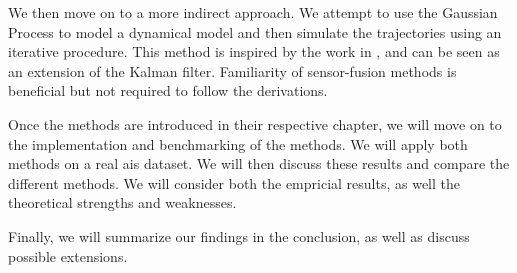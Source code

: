 We then move on to a more indirect approach. We attempt to use the Gaussian Process to model a dynamical model and then simulate the trajectories using an iterative procedure. This method is inspired by the work in \cite{pedestrian,gpekf}, and can be seen as an extension of the Kalman filter. Familiarity of sensor-fusion methods is beneficial but not required to follow the derivations.

Once the methods are introduced in their respective chapter, we will move on to the implementation and benchmarking of the methods. We will apply both methods on a real \acrshort{ais} dataset. We will then discuss these results and compare the different methods. We will consider both the empricial results, as well the theoretical strengths and weaknesses. 

Finally, we will summarize our findings in the conclusion, as well as discuss possible extensions.




